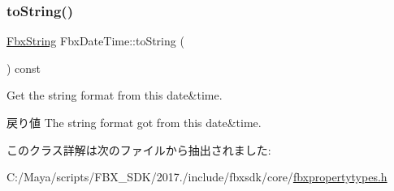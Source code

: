 \subsubsection{\texorpdfstring{to\+String()}{toString()}}
{\footnotesize\ttfamily \hyperlink{class_fbx_string}{Fbx\+String} Fbx\+Date\+Time\+::to\+String (\begin{DoxyParamCaption}{ }\end{DoxyParamCaption}) const}

Get the string format from this date\&time. \begin{DoxyReturn}{戻り値}
The string format got from this date\&time. 
\end{DoxyReturn}


このクラス詳解は次のファイルから抽出されました\+:\begin{DoxyCompactItemize}
\item 
C\+:/\+Maya/scripts/\+F\+B\+X\+\_\+\+S\+D\+K/2017./include/fbxsdk/core/\hyperlink{fbxpropertytypes_8h}{fbxpropertytypes.\+h}\end{DoxyCompactItemize}
